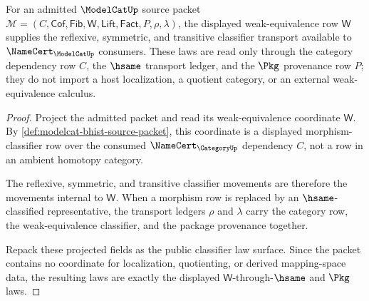 \begin{theorem}
\label{thm:modelcat-weak-equivalence-classifier-laws}
For an admitted $\ModelCatUp$ source packet
$\mathcal{M}=(C,\mathsf{Cof},\mathsf{Fib},\mathsf{W},\mathsf{Lift},\mathsf{Fact},P,\rho,\lambda)$,
the displayed weak-equivalence row $\mathsf{W}$ supplies the reflexive,
symmetric, and transitive classifier transport available to
$\NameCert_{\ModelCatUp}$ consumers. These laws are read only through the
category dependency row $C$, the $\hsame$ transport ledger, and the $\Pkg$
provenance row $P$; they do not import a host localization, a quotient
category, or an external weak-equivalence calculus.
\end{theorem}
\begin{proof}
Project the admitted packet and read its weak-equivalence coordinate
$\mathsf{W}$. By \autoref{def:modelcat-bhist-source-packet}, this coordinate is
a displayed morphism-classifier row over the consumed $\NameCert_{\CategoryUp}$
dependency $C$, not a row in an ambient homotopy category.

The reflexive, symmetric, and transitive classifier movements are therefore
the movements internal to $\mathsf{W}$. When a morphism row is replaced by an
$\hsame$-classified representative, the transport ledgers $\rho$ and $\lambda$
carry the category row, the weak-equivalence classifier, and the package
provenance together.

Repack these projected fields as the public classifier law surface. Since the
packet contains no coordinate for localization, quotienting, or derived
mapping-space data, the resulting laws are exactly the displayed
$\mathsf{W}$-through-$\hsame$ and $\Pkg$ laws.
\end{proof}

